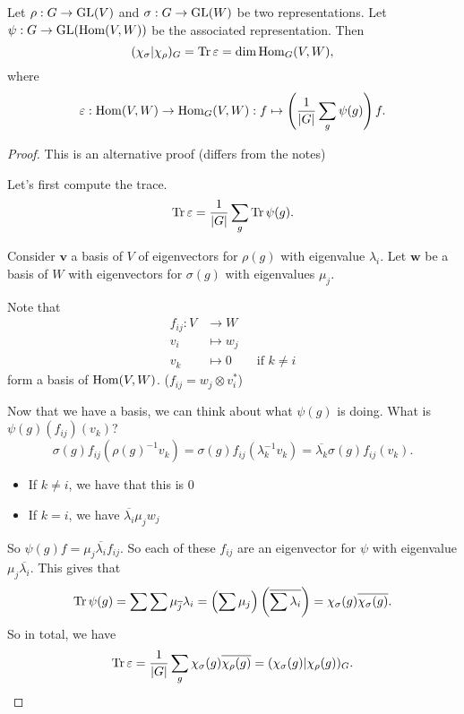 \begin{prop}[3.13']
    Let $\rho: G \to \operatorname{GL}(V)$ and $\sigma: G \to \operatorname{GL}(W)$ be two representations.
    Let $\psi: G \to  \operatorname{GL}(\operatorname{Hom}(V, W))$ be the associated representation.
    Then 
    \[
        (\chi_\sigma | \chi_\rho)_G =  \operatorname{Tr} \varepsilon = \dim \operatorname{Hom}_{G}(V, W)
    ,\] 
    where
    \[
        \varepsilon: \operatorname{Hom}(V, W) \to  \operatorname{Hom}_{G}(V, W) : f \mapsto  \left(\frac{1}{|G|} \sum_{g} \psi(g)\right) f 
    .\] 

\end{prop}
\begin{proof}
    This is an alternative proof (differs from the notes)
    

    Let's first compute the trace.
    \[
        \operatorname{Tr} \varepsilon = \frac{1}{|G|} \sum_g \operatorname{Tr} \psi(g)
    .\]

    Consider $\mathbf{v}$ a basis of $V$ of eigenvectors for $\rho(g)$ with eigenvalue $\lambda_i$.
    Let $\mathbf{w}$ be a basis of $W$ with eigenvectors for $\sigma(g)$ with eigenvalues $\mu_j$.

    Note that 
        \begin{align*}
            f_{ij}: V &\longrightarrow W \\
            v_i &\longmapsto w_j\\
            v_k &\longmapsto 0 \qquad \text{if $k \neq i$}
        \end{align*}
        form a basis of $\operatorname{Hom}(V, W)$. ($f_{ij} = w_j \otimes v_i^{*}$)

        Now that we have a basis, we can think about what $\psi(g)$ is doing.
        What is $\psi(g)(f_{ij})(v_k)$?
        \[
            \sigma(g) f_{ij}(\rho(g)^{-1} v_k)
            = \sigma(g) f_{ij}(\lambda_k^{-1} v_k)
            = \overline{\lambda_k} \sigma(g) f_{ij}( v_k)
        .\] 
        \begin{itemize}
            \item If $k \neq i $, we have that this is  $0$
            \item If $k = i$, we have  $\overline{\lambda_i} \mu_j w_j$
        \end{itemize}
        So $\psi(g) f = \mu_j \overline{\lambda_i} f_{ij}$.
        So each of these $f_{ij}$ are an eigenvector for $\psi$ with eigenvalue  $\mu_j \overline{\lambda_i}$.
        This gives that
        \[
            \operatorname{Tr} \psi(g) = \sum \sum \mu_{\overline{j}} \lambda_i  = \left(\sum \mu_j\right) \left(\overline{\sum \lambda_i}\right) = \chi_\sigma(g)\overline{\chi_\sigma(g)} 
        .\] 
        So in total, we have
        \[
            \operatorname{Tr} \varepsilon = \frac{1}{|G|} \sum_{g} \chi_\sigma(g) \overline{\chi_\rho (g)} = (\chi_\sigma(g) | \chi_\rho(g))_G
        .\] 
\end{proof}

